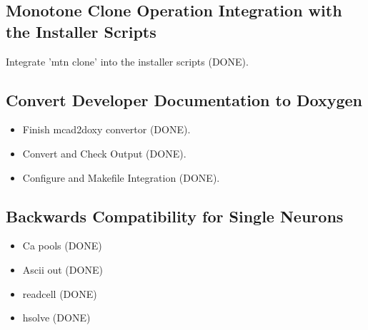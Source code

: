 \documentclass[12pt]{article}
\begin{document}
\subsection{Monotone Clone Operation Integration with the Installer Scripts}
Integrate 'mtn clone' into the installer scripts (DONE).

\subsection{Convert Developer Documentation to Doxygen}

\begin{itemize}
\item Finish mcad2doxy convertor (DONE).
\item Convert and Check Output (DONE).
\item Configure and Makefile Integration (DONE).
\end{itemize}

\subsection{Backwards Compatibility for Single Neurons}

\begin{itemize}
\item Ca pools (DONE)
\item Ascii out (DONE)
\item readcell (DONE)
\item hsolve (DONE)
\end{itemize}
\end{document}
